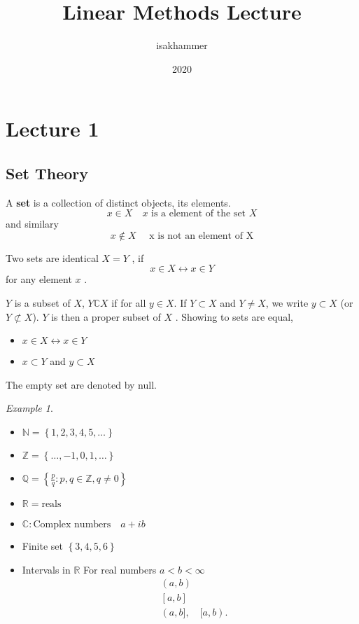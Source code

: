 \documentclass{article}
\title{Linear Methods Lecture}
\author{isakhammer }
\date{2020}
\theoremstyle{remark}
\newtheorem{example}{Example}
\begin{document}
\maketitle
\tableofcontents
\newpage

\newpage
\section{Lecture 1}%
\label{sec:lecture_1}

\subsection{Set Theory}%
\label{sub:set_theory}

\begin{definition}
  A \textbf{set} is a collection of distinct objects, its elements. \[
  x \in X \quad  x \text{ is a element of the set } X 
  \] 
  and similary 
  \[
  x \not\in X \quad  \text{ x is not an element of X} 
  \] 

  \par
   Two sets are identical $X=Y$ , if \[
   x \in X \leftrightarrow x \in Y
   \] 
   for any element  $x$ .
\end{definition}

\begin{definition}
  $Y$ is a subset of $X$, $Y \mathbb{C}  X$ if for all $y \in X$. If $Y \subset X $ and $Y \neq X$, we write $y \subset X$ (or $Y \not \subset X$). $Y$ is then a proper subset of $X$ .
  Showing to sets are equal, 
  \begin{itemize}
    \item $x \in X \leftrightarrow x \in Y$
    \item $x \subset Y$ and $ y \subset X$
  \end{itemize}
  The empty set are denoted by null.
\end{definition}

\begin{example}
  \begin{itemize}
    \item $\mathbb{N}  = \left\{ 1,2,3,4,5, \ldots \right\}$
    \item $\mathbb{Z}  = \left\{ \ldots, -1,0,1,\ldots \right\}$
    \item $\mathbb{Q}  = \left\{ \frac{p}{q}: p,q \in \mathbb{Z} , q \neq0 \right\}$ 
    \item $\mathbb{R}  = \text{reals}$ 
    \item $\mathbb{C}: \text{Complex numbers} \quad  a + ib  $ 
    \item Finite set $\left\{ 3,4,5,6 \right\}$ 
    \item Intervals in $\mathbb{R} $ For real numbers $a < b < \infty$
      \begin{align*}
        & (a,b)\\
        & \left[ a,b \right] \\
        & (a,b] , \quad  [a,b) 
      .\end{align*}
  \end{itemize} 
\end{example}
\end{document}

